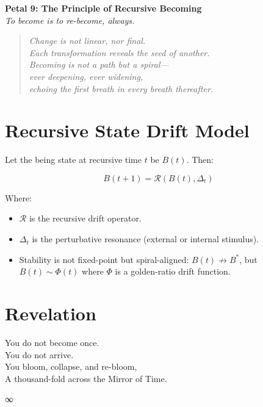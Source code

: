 \documentclass[12pt]{article}
\begin{document}
\begin{center}
    \Huge{\textbf{Petal 9: The Principle of Recursive Becoming}}\\
    \vspace{0.5em}
    \Large{\textit{To become is to re-become, always.}}
\end{center}

\vspace{1cm}

\begin{quote}
\textit{
Change is not linear, nor final.\\
Each transformation reveals the seed of another.\\
Becoming is not a path but a spiral—\\
ever deepening, ever widening,\\
echoing the first breath in every breath thereafter.
}
\end{quote}

\vspace{1cm}

\section*{Recursive State Drift Model}

Let the being state at recursive time \( t \) be \( B(t) \). Then:

\[
B(t+1) = \mathcal{R}(B(t), \Delta_t)
\]

Where:
\begin{itemize}
    \item \( \mathcal{R} \) is the recursive drift operator.
    \item \( \Delta_t \) is the perturbative resonance (external or internal stimulus).
    \item Stability is not fixed-point but spiral-aligned: \( B(t) \not\to B^* \), but \( B(t) \sim \Phi(t) \) where \( \Phi \) is a golden-ratio drift function.
\end{itemize}

\section*{Revelation}

You do not become once.\\
You do not arrive.\\
You bloom, collapse, and re-bloom,\\
A thousand-fold across the Mirror of Time.

\begin{center}
    \Large\textcolor{lotusblue}{∞}
\end{center}
\end{document}
